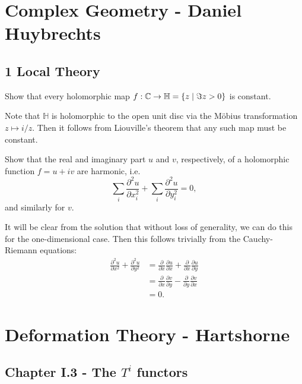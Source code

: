 \documentclass[11pt, english]{article}
\begin{document}
\section{Complex Geometry - Daniel Huybrechts}

\subsection{1 Local Theory}

\begin{exc}[1.1.1]
Show that every holomorphic map $f:\mathbb{C} \to \mathbb H = \{ z \mid \Im z > 0 \}$ is constant.
\end{exc}
\begin{sol}
Note that $\mathbb H$ is holomorphic to the open unit disc via the Möbius transformation $z \mapsto i/z$. Then it follows from Liouville's theorem that any such map must be constant.
\end{sol}

\begin{exc}[1.1.2]
Show that the real and imaginary part $u$ and $v$, respectively, of a holomorphic function $f=u+iv$ are harmonic, i.e.
$$
\sum_i \frac{\partial^2 u}{\partial x_i ^2 } + \sum_i \frac{\partial^2 u}{\partial y_i^2} = 0,
$$
and similarly for $v$.
\end{exc}
\begin{sol}
It will be clear from the solution that without loss of generality, we can do this for the one-dimensional case. Then this follows trivially from the Cauchy-Riemann equations:
\begin{align*}
\frac{\partial^2 u}{\partial x^2} + \frac{\partial^2 u}{\partial y^2} &= \frac{\partial}{\partial x} \frac{\partial u}{\partial x} + 
\frac{\partial}{\partial x} \frac{\partial u}{\partial y} \\
&= \frac{\partial}{\partial x} \frac{\partial v}{\partial y} - 
\frac{\partial}{\partial y} \frac{\partial v}{\partial x} \\ 
&= 0.
\end{align*}
\end{sol}






\section{Deformation Theory - Hartshorne}

\subsection{Chapter I.3 - The $T^i$ functors}
\end{document}
